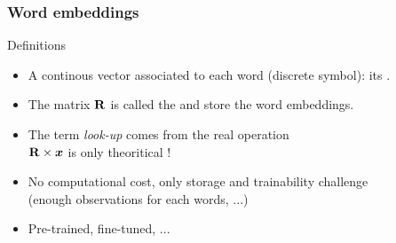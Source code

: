 \begin{frame}
  \frametitle{Word embeddings}
  \begin{block}{Definitions}
    \begin{itemize}
    \item A continous vector associated to each word (discrete symbol): its
      . 
    \item The matrix $\mathbf{R}$ is called the  and store the word embeddings. 
    \end{itemize}
  \end{block}
  \begin{itemize}
  \item The term \textit{look-up} comes from the real operation\\
    $\mathbf{R}\times\boldsymbol{x}$ is only theoritical !
  \item No computational cost, only storage and trainability
    challenge\\ (enough observations for each words, ...) 
  \item Pre-trained, fine-tuned, ... 
  \end{itemize}
\end{frame}



